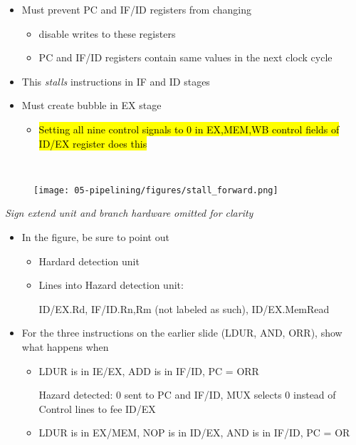 \begin{frame}[fragile]
\begin{itemize}
\item Must prevent PC and IF/ID registers from changing
\begin{itemize}
\item disable writes to these registers
\item PC and IF/ID registers contain same values in the next clock cycle
\end{itemize}
\item This \textit{stalls} instructions in IF and ID stages
\item Must create bubble in EX stage
\begin{itemize}
\item \hl{Setting all nine control signals to 0 in EX,MEM,WB control
fields of ID/EX register does this}
\end{itemize}

\end{itemize}
\BNotes\ifnum{}
~%
\fi\ENotes
\end{frame}

\newpage
\begin{frame}[fragile]
\begin{figure}[H]
\centering
	{\texttt{[image: 05-pipelining/figures/stall\_forward.png]}}
\end{figure}
\textit{Sign extend unit and branch hardware omitted for clarity}

\BNotes\ifnum{}
\begin{itemize}
\item In the figure, be sure to point out
\begin{itemize}
	\item Hardard detection unit
	\item Lines into Hazard detection unit:

		ID/EX.Rd, IF/ID.Rn,Rm (not labeled as such), ID/EX.MemRead
\end{itemize}
\item For the three instructions on the earlier slide (LDUR, AND, ORR), show
	what happens when 
	\begin{itemize}
		\item LDUR is in IE/EX, ADD is in IF/ID, PC = ORR

			Hazard detected: 0 sent to PC and IF/ID, MUX selects 0 instead of Control lines to fee ID/EX
		\item LDUR is in EX/MEM, NOP is in ID/EX, AND is in IF/ID, PC = OR
	\end{itemize}
\end{itemize}
\fi\ENotes
\end{frame}

